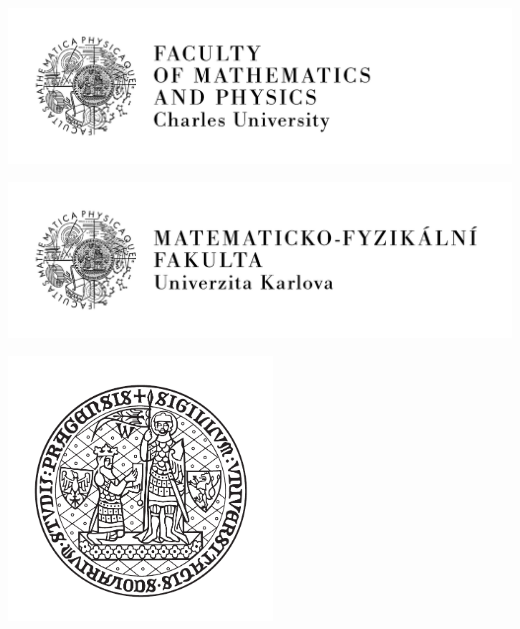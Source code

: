 
\pagestyle{empty}
\hypersetup{pageanchor=false}
\begin{center}

\ifMFF
\ifEN
\centerline{\mbox{\includegraphics[width=166mm]{img/logo-en.pdf}}}
\else
\centerline{\mbox{\includegraphics[width=166mm]{img/logo-cs.pdf}}}
\fi
\vspace{-8mm}
\else
{\large\noindent\UKName\par\medskip\par\UKFaculty }
\fi
\vfill

{\bf\Large\ThesisTypeName}

\vfill

\ifMFF\relax\else\includegraphics[width=70mm]{img/uklogo.pdf}

\vfill\fi

{\LARGE\ThesisAuthor}

\vspace{15mm}


\end{center}
